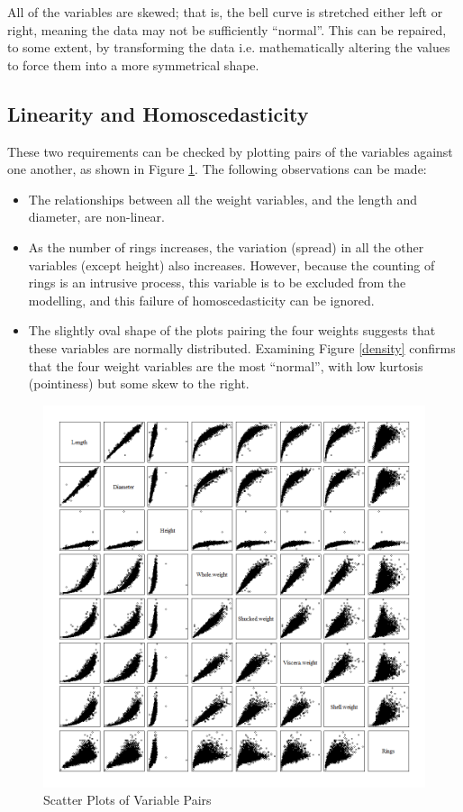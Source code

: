 \documentclass[11pt, a4paper]{article}
\begin{document}
    All of the variables are skewed; that is, the bell curve is stretched either left or right, meaning the data may not be sufficiently ``normal''. This can be repaired, to some extent, by transforming the data i.e. mathematically altering the values to force them into a more symmetrical shape.

    \subsection{Linearity and Homoscedasticity}

    These two requirements can be checked by plotting pairs of the variables against one another, as shown in Figure \ref{pairs}. The following observations can be made:

    \begin{itemize}
        \item The relationships between all the weight variables, and the length and diameter, are non-linear. 
        \item As the number of rings increases, the variation (spread) in all the other variables (except height) also increases. However, because the counting of rings is an intrusive process, this variable is to be excluded from the modelling, and this failure of homoscedasticity can be ignored.
        \item The slightly oval shape of the plots pairing the four weights suggests that these variables are normally distributed. Examining Figure \ref{density} confirms that the four weight variables are the most ``normal'', with low kurtosis (pointiness) but some skew to the right.
    \end{itemize}

    \begin{figure}[ht]
        \centering
        \includegraphics[width=\textwidth]{1.3.png}
        \caption{Scatter Plots of Variable Pairs}
        \label{pairs}
    \end{figure}
\end{document}
